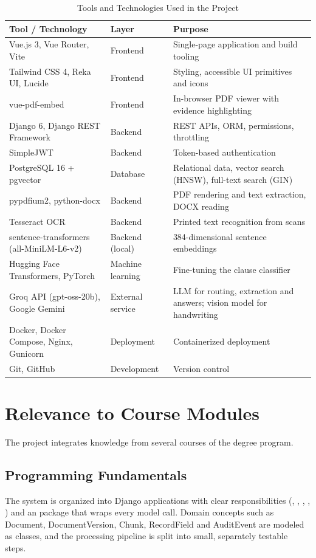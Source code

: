 \begin{table}[H]\centering
\caption{Tools and Technologies Used in the Project}\label{tab:tools}
\begin{tabularx}{\textwidth}{|p{4.2cm}|p{2.8cm}|X|}\hline
\textbf{Tool / Technology} & \textbf{Layer} & \textbf{Purpose} \\ \hline
Vue.js 3, Vue Router, Vite & Frontend & Single-page application and build tooling \\ \hline
Tailwind CSS 4, Reka UI, Lucide & Frontend & Styling, accessible UI primitives and icons \\ \hline
vue-pdf-embed & Frontend & In-browser PDF viewer with evidence highlighting \\ \hline
Django 6, Django REST Framework & Backend & REST APIs, ORM, permissions, throttling \\ \hline
SimpleJWT & Backend & Token-based authentication \\ \hline
PostgreSQL 16 + pgvector & Database & Relational data, vector search (HNSW), full-text search (GIN) \\ \hline
pypdfium2, python-docx & Backend & PDF rendering and text extraction, DOCX reading \\ \hline
Tesseract OCR & Backend & Printed text recognition from scans \\ \hline
sentence-transformers (all-MiniLM-L6-v2) & Backend (local) & 384-dimensional sentence embeddings \\ \hline
Hugging Face Transformers, PyTorch & Machine learning & Fine-tuning the clause classifier \\ \hline
Groq API (gpt-oss-20b), Google Gemini & External service & LLM for routing, extraction and answers; vision model for handwriting \\ \hline
Docker, Docker Compose, Nginx, Gunicorn & Deployment & Containerized deployment \\ \hline
Git, GitHub & Development & Version control \\ \hline
\end{tabularx}
\end{table}

\section{Relevance to Course Modules}
The project integrates knowledge from several courses of the degree program.

\subsection{Programming Fundamentals}
The system is organized into Django applications with clear responsibilities (,
, , , ) and an  package that
wraps every model call. Domain concepts such as Document, DocumentVersion, Chunk, RecordField and
AuditEvent are modeled as classes, and the processing pipeline is split into small, separately
testable steps.

